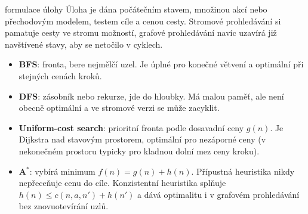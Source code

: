 \begin{defbox}{formulace úlohy}
Úloha je dána počátečním stavem, množinou akcí nebo přechodovým modelem, testem cíle a cenou cesty. Stromové prohledávání si pamatuje cesty ve stromu možností, grafové prohledávání navíc uzavírá již navštívené stavy, aby se netočilo v cyklech.
\end{defbox}

\begin{itemize}[leftmargin=1.2em,itemsep=1pt,topsep=1pt]
  \item \textbf{BFS}: fronta, bere nejmělčí uzel. Je úplné pro konečné větvení a optimální při stejných cenách kroků.
  \item \textbf{DFS}: zásobník nebo rekurze, jde do hloubky. Má malou paměť, ale není obecně optimální a ve stromové verzi se může zacyklit.
  \item \textbf{Uniform-cost search}: prioritní fronta podle dosavadní ceny $g(n)$. Je Dijkstra nad stavovým prostorem, optimální pro nezáporné ceny (v nekonečném prostoru typicky pro kladnou dolní mez ceny kroku).
  \item \textbf{A$^*$}: vybírá minimum $f(n)=g(n)+h(n)$. Přípustná heuristika nikdy nepřeceňuje cenu do cíle. Konzistentní heuristika splňuje $h(n)\le c(n,a,n')+h(n')$ a dává optimalitu i v grafovém prohledávání bez znovuotevírání uzlů.
\end{itemize}

